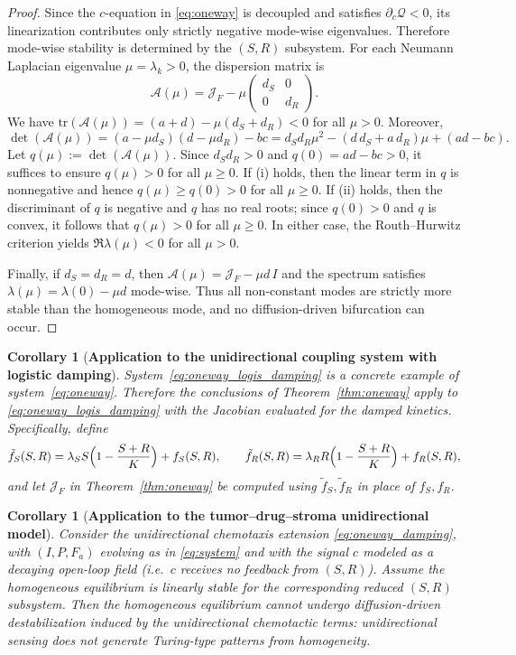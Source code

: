 \documentclass[pdflatex,sn-mathphys-ay]{sn-jnl}
\theoremstyle{thmstyleone}
\newtheorem{corollary}[theorem]{Corollary}
\theoremstyle{definition}
\theoremstyle{remark}
\begin{document}
\begin{proof}
Since the $c$-equation in \eqref{eq:oneway} is decoupled and satisfies $\partial_c\mathcal Q<0$, its linearization contributes only strictly negative mode-wise eigenvalues. 
Therefore mode-wise stability is determined by the $(S,R)$ subsystem. 
For each Neumann Laplacian eigenvalue $\mu=\lambda_k>0$, the dispersion matrix is
\[
\mathcal{A}(\mu)=\mathcal{J}_F-\mu
\begin{pmatrix}
d_S & 0\\
0 & d_R
\end{pmatrix}.
\]
We have $\mathrm{tr}(\mathcal{A}(\mu))=(a+d)-\mu(d_S+d_R)<0$ for all $\mu>0$. Moreover,
\[
\det(\mathcal{A}(\mu))
=(a-\mu d_S)(d-\mu d_R)-bc
= d_Sd_R\mu^2-(d\,d_S+a\,d_R)\mu+(ad-bc).
\]
Let $q(\mu):=\det(\mathcal{A}(\mu))$. Since $d_Sd_R>0$ and $q(0)=ad-bc>0$, it suffices to ensure $q(\mu)>0$ for all $\mu\ge 0$. 
If (i) holds, then the linear term in $q$ is nonnegative and hence $q(\mu)\ge q(0)>0$ for all $\mu\ge0$. 
If (ii) holds, then the discriminant of $q$ is negative and $q$ has no real roots; since $q(0)>0$ and $q$ is convex, it follows that $q(\mu)>0$ for all $\mu\ge0$. 
In either case, the Routh--Hurwitz criterion yields $\Re\lambda(\mu)<0$ for all $\mu>0$.

Finally, if $d_S=d_R=d$, then $\mathcal{A}(\mu)=\mathcal{J}_F-\mu d\,I$ and the spectrum satisfies $\lambda(\mu)=\lambda(0)-\mu d$ mode-wise. 
Thus all non-constant modes are strictly more stable than the homogeneous mode, and no diffusion-driven bifurcation can occur.
\end{proof}

\begin{corollary}[\textbf{Application to the unidirectional coupling system with logistic damping}]\label{cor:oneway_logis_damping}
System~\eqref{eq:oneway_logis_damping} is a concrete example of system~\eqref{eq:oneway}. 
Therefore the conclusions of Theorem~\ref{thm:oneway} apply to \eqref{eq:oneway_logis_damping} with the Jacobian evaluated for the damped kinetics. 
Specifically, define
\[
\tilde f_S(S,R)=\lambda_S S\Bigl(1-\frac{S+R}{K}\Bigr)+f_S(S,R),
\qquad
\tilde f_R(S,R)=\lambda_R R\Bigl(1-\frac{S+R}{K}\Bigr)+f_R(S,R),
\]
and let $\mathcal{J}_F$ in Theorem~\ref{thm:oneway} be computed using $\tilde f_S,\tilde f_R$ in place of $f_S,f_R$.
\end{corollary}

\begin{corollary}[\textbf{Application to the tumor--drug--stroma unidirectional model}]
\label{cor:oneway_damping}
Consider the unidirectional chemotaxis extension \eqref{eq:oneway_damping}, with $(I,P,F_a)$ evolving as in \eqref{eq:system} and with the signal $c$ modeled as a decaying open-loop field (i.e.\ $c$ receives no feedback from $(S,R)$). 
Assume the homogeneous equilibrium is linearly stable for the corresponding reduced $(S,R)$ subsystem. 
Then the homogeneous equilibrium cannot undergo diffusion-driven destabilization induced by the unidirectional chemotactic terms: unidirectional sensing does not generate Turing-type patterns from homogeneity.
\end{corollary}
\end{document}

